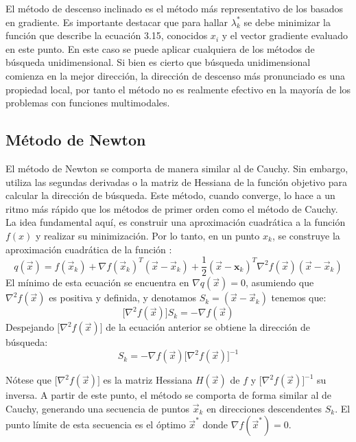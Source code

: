 El método de descenso inclinado es el método más representativo de los basados en gradiente. Es importante destacar que para hallar $\lambda^*_k$ se debe minimizar la función que describe la ecuación 3.15, conocidos $x_i$ y el vector gradiente evaluado en este punto. En este caso se puede aplicar cualquiera de los métodos de búsqueda unidimensional. Si bien es cierto que búsqueda unidimensional comienza en la mejor dirección, la dirección de descenso más pronunciado es una propiedad local, por tanto el método no es realmente efectivo en la mayoría de los problemas con funciones multimodales.
\subsection{Método de Newton}
El método de Newton se comporta de manera similar al de Cauchy. Sin embargo, utiliza las segundas derivadas o la matriz de Hessiana de la función objetivo para calcular la dirección de búsqueda. Este método, cuando converge, lo hace a un ritmo más rápido que los métodos de primer orden como el método de Cauchy. La idea fundamental aquí, es construir una aproximación cuadrática a la función $f (x)$ y realizar su minimización. Por lo tanto, en un punto $x_k$, se construye la aproximación cuadrática de la función \cite{belegundu_optimization_2011}:
\begin{equation}
q(\vec{x})= f(\vec{x}_k) +\nabla f(\vec{x}_k)^T (\vec{x}-\vec{x}_k) +\frac{1}{2} (\vec{x}-\textbf{x}_k)^T \nabla^2 f(\vec{x}) (\vec{x}-\vec{x}_k)
\end{equation}
El mínimo de esta ecuación se encuentra en $ \nabla q(\vec{x})=0$, asumiendo que  $\nabla^2 f(\vec{x})$ es positiva y definida, y denotamos $S_k=(\vec{x}-\vec{x}_k)$  tenemos que:
\begin{equation}
  \big[ \nabla^2 f(\vec{x}) \big ] S_k=- \nabla f(\vec{x}) 
\end{equation}
Despejando  $\big[ \nabla^2 f(\vec{x}) \big ]$ de la ecuación anterior se obtiene la dirección de búsqueda:
\begin{equation}
S_k=- \nabla f(\vec{x})   \big[ \nabla^2 f(\vec{x}) \big ]^{-1}
\end{equation}

Nótese que $ \big[ \nabla^2 f(\vec{x}) \big ]$  es la matriz Hessiana $H(\vec{x})$ de $f$ y $\big[ \nabla^2 f(\vec{x}) \big ]^{-1}$ su inversa. A partir de este punto, el método se comporta de forma similar al de Cauchy, generando una secuencia de puntos $\vec{x}_k$ en direcciones descendentes $S_k$. El punto límite de esta secuencia es el óptimo $\vec{x}^*$ donde $\nabla f(\vec{x}^*) = 0$. 

